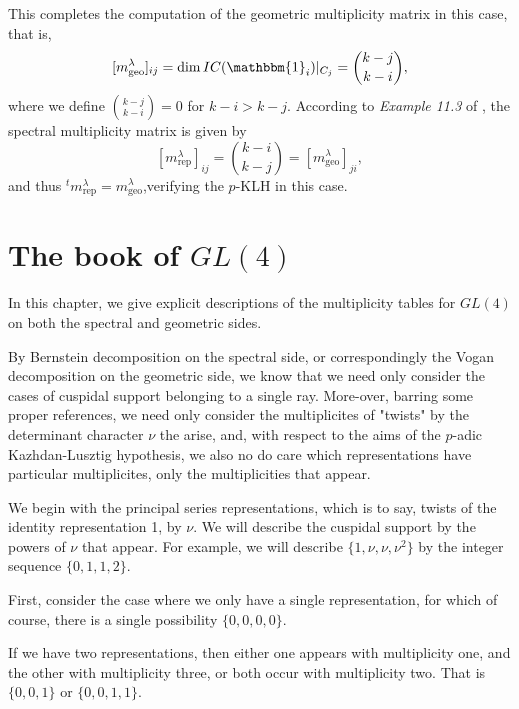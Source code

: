 \documentclass{memoir}
\newcommand{\tx}{\text}
\theoremstyle{definition}
\begin{document}
	This completes the computation of the geometric multiplicity matrix in this case, that is, 
	$$[m_{\tx{geo}}^\lambda]_{ij}=\dim IC(\mathbbm{1}_i)|_{C_j}=\binom{k-j}{k-i},$$
	where we define $\binom{k-j}{k-i}=0$ for $k-i>k-j$.  
	According to \emph{Example 11.3} of \cite{ZelI2}, the spectral multiplicity matrix is given by 
	$$[m_{\tx{rep}}^\lambda]_{ij}=\binom{k-i}{k-j}=[m_{\tx{geo}}^\lambda]_{ji},$$
	and thus ${}^tm_{\tx{rep}}^\lambda=m_{\tx{geo}}^\lambda$,verifying the $p$-KLH in this case. 
	
	
	
	
	
	
	
	
	
	
	
	
	
	
	
	
	
	
	
	
	
	
	\chapter{The book of $GL(4)$}
	
	In this chapter, we give explicit descriptions of the multiplicity tables for $GL(4)$ on both the spectral and geometric sides. 
	
	
	By Bernstein decomposition on the spectral side, or correspondingly the Vogan decomposition on the geometric side, we know that we need only consider the cases of cuspidal support belonging to a single ray.  
	More-over, barring some proper references, we need only consider the multiplicites of "twists" by the determinant character $\nu$ the arise, and, with respect to the aims of the $p$-adic Kazhdan-Lusztig hypothesis, we also no do care which representations have particular multiplicites, only the multiplicities that appear. 
	
	We begin with the principal series representations, which is to say, twists of the identity representation 1, by $\nu$.  
	We will describe the cuspidal support by the powers of $\nu$ that appear.  
	For example, we will describe $\{1, \nu, \nu, \nu^2\}$ by the integer sequence $\{0, 1, 1, 2\}$.  
	
	First, consider the case where we only have a single representation, for which of course, there is a single possibility $\{0, 0, 0, 0\}$.  
	
	If we have two representations, then either one appears with multiplicity one, and the other with multiplicity three, or both occur with multiplicity two. 
	That is $\{0, 0, 1\}$ or $\{0, 0, 1, 1\}$.  
	
\end{document}
